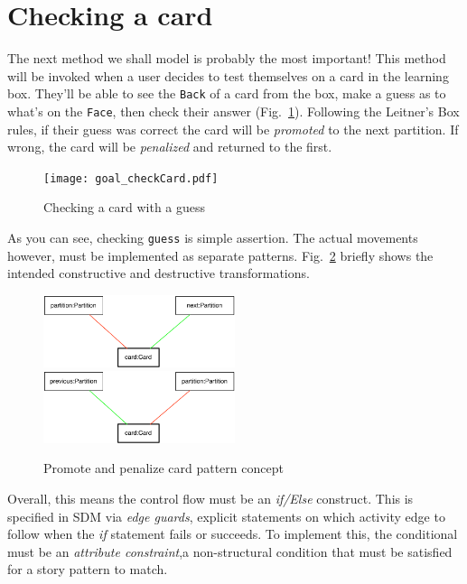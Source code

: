 \newpage
\hypertarget{sec:checkCard}{}
\section{Checking a card}
\genHeader

The next method we shall model is probably the most important! This method will be invoked when a user decides to test themselves on a card in the
learning box. They'll be able to see the \texttt{Back} of a card from the box, make a guess as to what's on the \texttt{Face}, then check their
answer (Fig.~\ref{fig:goal_check}). Following the Leitner's Box rules, if their guess was correct the card will be \emph{promoted} to the next
partition. If wrong, the card will be \emph{penalized} and returned to the first.

\begin{figure}[htbp]
 	\centering
   \texttt{[image: goal\_checkCard.pdf]}
 	\caption{Checking a card with a guess}
 	\label{fig:goal_check}
\end{figure}
\FloatBarrier

As you can see, checking \texttt{guess} is simple assertion. The actual movements however, must be implemented as separate patterns.
Fig.~\ref{fig:patterns_check} briefly shows the intended constructive and destructive transformations.

\begin{figure}[htbp]
 	\centering
   \includegraphics[width=0.5\textwidth]{checkCard_promote.pdf}
   \\ \vspace{1cm}
    \includegraphics[width=0.5\textwidth]{checkCard_penalize.pdf}
 	\caption{Promote and penalize card pattern concept}
 	\label{fig:patterns_check}
\end{figure}
\FloatBarrier

Overall, this means the control flow must be an \emph{if/Else} construct. This is specified in SDM via \emph{edge guards}, explicit
statements on which activity edge to follow when the \emph{if} statement fails or succeeds. To implement this, the conditional must be an \emph{attribute
constraint},a non-structural condition that must be satisfied for a story pattern to match. 






